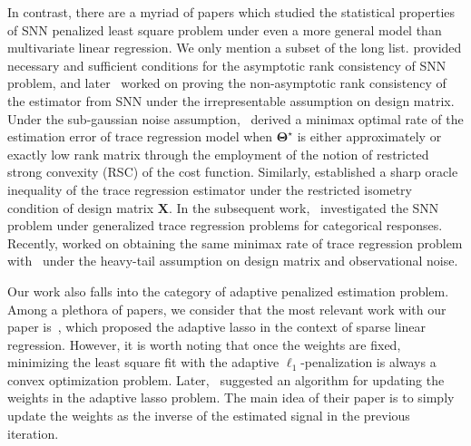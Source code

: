 \documentclass[alpha-refs]{wiley-article}
\begin{document}
In contrast, there are a myriad of papers which studied the statistical properties of SNN penalized least square problem under even a more general model than multivariate linear regression.
We only mention a subset of the long list.
\citet{bach2008consistency} provided necessary and sufficient conditions for the asymptotic rank consistency of SNN problem, and later~\citet{lee2015model} worked on proving the non-asymptotic rank consistency of the estimator from SNN under the irrepresentable assumption on design matrix.
Under the sub-gaussian noise assumption,~\citet{negahban2011estimation} derived a minimax optimal rate of the estimation error of trace regression model when $\boldsymbol{\Theta}^{\star}$ is either approximately or exactly low rank matrix through the employment of the notion of restricted strong convexity (RSC) of the cost function.
Similarly, \citet{koltchinskii2011nuclear} established a sharp oracle inequality of the trace regression estimator under the restricted isometry condition of design matrix $\boldsymbol{X}$.
In the subsequent work,~\citet{fan2019generalized} investigated the SNN problem under generalized trace regression problems for categorical responses.
Recently, \citet{fan2021shrinkage} worked on obtaining the same minimax rate of trace regression problem with~\citet{negahban2011estimation} under the heavy-tail assumption on design matrix and observational noise.

Our work also falls into the category of adaptive penalized estimation problem.
Among a plethora of papers, we consider that the most relevant work with our paper is~\citet{zou2006adaptive}, which proposed the adaptive lasso in the context of sparse linear regression.
However, it is worth noting that once the weights are fixed, minimizing the least square fit with the adaptive $\ell_{1}$-penalization is always a convex optimization problem.
Later,~\citet{candes2008enhancing} suggested an algorithm for updating the weights in the adaptive lasso problem.
The main idea of their paper is to simply update the weights as the inverse of the estimated signal in the previous iteration.
\end{document}
